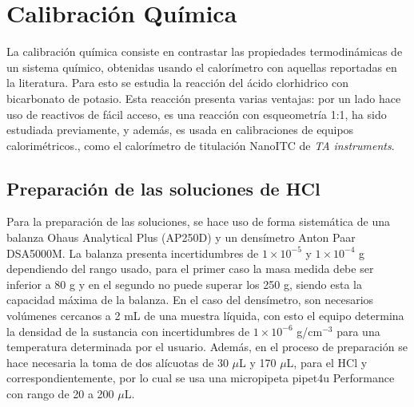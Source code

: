 
%




\chapter{Calibraci\'on Qu\'imica}
	La calibraci\'on qu\'imica consiste en contrastar las propiedades termodin\'amicas de un sistema qu\'imico, obtenidas usando el calor\'imetro con aquellas reportadas en la literatura. Para esto se estudia la reacci\'on del \'acido clorhidrico con bicarbonato de potasio. Esta reacci\'on presenta varias ventajas: por un lado hace uso de reactivos de f\'acil acceso, es una reacci\'on con esqueometr\'ia 1:1, ha sido estudiada previamente, y adem\'as, es usada en calibraciones de equipos calorim\'etricos., como el calor\'imetro de titulaci\'on NanoITC de \textit{TA instruments}.
	
\section{Preparaci\'on de las soluciones de HCl}\label{sec: soluciones}
	Para la preparaci\'on de las soluciones, se hace uso de forma sistem\'atica de una balanza Ohaus Analytical Plus (AP250D) y un dens\'imetro Anton Paar DSA5000M. La balanza presenta incertidumbres de $1\times10^{-5}$ y $1\times10^{-4}$ g dependiendo del rango usado, para el primer caso la masa medida debe ser inferior a 80 g y en el segundo no puede superar los 250 g, siendo esta la capacidad máxima de la balanza. En el caso del densímetro, son necesarios volúmenes cercanos a 2 mL de una muestra líquida, con esto el equipo determina la densidad de la sustancia con incertidumbres de $1\times10^{-6}$ g/cm$^{-3}$ para una temperatura determinada por el usuario. Adem\'as, en el proceso de preparaci\'on se hace necesaria la toma de dos al\'icuotas de 30 $\mu$L y 170 $\mu$L, para el HCl y  correspondientemente, por lo cual se usa una micropipeta pipet4u Performance con rango de 20 a 200 $\mu$L.
	
